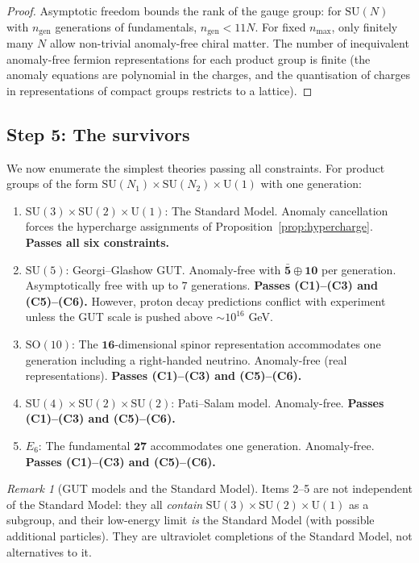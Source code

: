 \documentclass[12pt]{article}
\theoremstyle{definition}
\theoremstyle{remark}
\newtheorem{remark}[theorem]{Remark}
\newcommand{\SU}{\mathrm{SU}}
\newcommand{\SO}{\mathrm{SO}}
\newcommand{\UU}{\mathrm{U}}
\begin{document}
\begin{proof}
Asymptotic freedom bounds the rank of the gauge group:
for $\SU(N)$ with $n_{\mathrm{gen}}$ generations of fundamentals,
$n_{\mathrm{gen}} < 11N$.  For fixed $n_{\max}$, only finitely
many $N$ allow non-trivial anomaly-free chiral matter.
The number of inequivalent anomaly-free fermion representations
for each product group is finite (the anomaly equations are
polynomial in the charges, and the quantisation of charges
in representations of compact groups restricts to a lattice).
\end{proof}

\subsection{Step 5: The survivors}

We now enumerate the simplest theories passing all constraints.
For product groups of the form
$\SU(N_1) \times \SU(N_2) \times \UU(1)$ with one generation:

\begin{enumerate}
\item $\SU(3) \times \SU(2) \times \UU(1)$:
  The Standard Model.  Anomaly cancellation forces the
  hypercharge assignments of Proposition~\ref{prop:hypercharge}.
  \textbf{Passes all six constraints.}

\item $\SU(5)$: Georgi--Glashow GUT.  Anomaly-free with
  $\bar{\mathbf{5}} \oplus \mathbf{10}$ per generation.
  Asymptotically free with up to $7$ generations.
  \textbf{Passes (C1)--(C3) and (C5)--(C6).}  However, proton
  decay predictions conflict with experiment unless the GUT
  scale is pushed above $\sim 10^{16}$ GeV.

\item $\SO(10)$: The $\mathbf{16}$-dimensional spinor
  representation accommodates one generation including a
  right-handed neutrino.  Anomaly-free (real representations).
  \textbf{Passes (C1)--(C3) and (C5)--(C6).}

\item $\SU(4) \times \SU(2) \times \SU(2)$: Pati--Salam model.
  Anomaly-free.  \textbf{Passes (C1)--(C3) and (C5)--(C6).}

\item $E_6$: The fundamental $\mathbf{27}$ accommodates one
  generation.  Anomaly-free.  \textbf{Passes (C1)--(C3) and
  (C5)--(C6).}
\end{enumerate}

\begin{remark}[GUT models and the Standard Model]
Items 2--5 are not independent of the Standard Model: they all
\emph{contain} $\SU(3) \times \SU(2) \times \UU(1)$ as a
subgroup, and their low-energy limit \emph{is} the Standard
Model (with possible additional particles).  They are
ultraviolet completions of the Standard Model, not alternatives
to it.
\end{remark}
\end{document}
